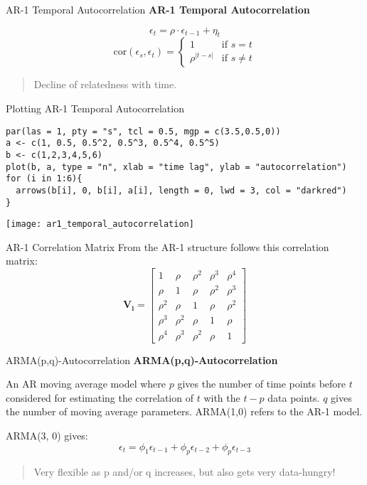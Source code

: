 \documentclass{beamer}
\begin{document}
\begin{frame}{AR-1 Temporal Autocorrelation}
  \textbf{AR-1 Temporal Autocorrelation}
  
  \[
  \epsilon_t = \rho \cdot \epsilon_{t-1} + \eta_t
  \]
  \[
  \text{cor}(\epsilon_s, \epsilon_t) = 
  \begin{cases}
    1 & \text{if } s = t \\
    \rho^{\vert t-s \vert} & \text{if } s \neq t
  \end{cases}
  \]
  \begin{quote}
    Decline of relatedness with time.
  \end{quote}
\end{frame}

\begin{frame}[fragile]{Plotting AR-1 Temporal Autocorrelation}
  \begin{verbatim}
par(las = 1, pty = "s", tcl = 0.5, mgp = c(3.5,0.5,0))
a <- c(1, 0.5, 0.5^2, 0.5^3, 0.5^4, 0.5^5)
b <- c(1,2,3,4,5,6)
plot(b, a, type = "n", xlab = "time lag", ylab = "autocorrelation")
for (i in 1:6){
  arrows(b[i], 0, b[i], a[i], length = 0, lwd = 3, col = "darkred")
}
  \end{verbatim}
  \begin{center}
    \texttt{[image: ar1\_temporal\_autocorrelation]} %
  \end{center}
\end{frame}

\begin{frame}{AR-1 Correlation Matrix}
  From the AR-1 structure follows this correlation matrix:
  \[
  \mathbf{V_i} = 
  \begin{bmatrix}
  1 & \rho & \rho^2 & \rho^3 & \rho^4 \\
  \rho & 1 & \rho & \rho^2 & \rho^3 \\
  \rho^2 & \rho & 1 & \rho & \rho^2 \\
  \rho^3 & \rho^2 & \rho & 1 & \rho \\
  \rho^4 & \rho^3 & \rho^2 & \rho & 1
  \end{bmatrix}
  \]
\end{frame}

\begin{frame}{ARMA(p,q)-Autocorrelation}
  \textbf{ARMA(p,q)-Autocorrelation}
  
  An AR moving average model where $p$ gives the number of time points before $t$ considered for estimating the correlation of $t$ with the $t - p$ data points. $q$ gives the number of moving average parameters. ARMA(1,0) refers to the AR-1 model.
  
  ARMA(3, 0) gives:
  \[
  \epsilon_t = \phi_1\epsilon_{t-1} + \phi_p\epsilon_{t-2} + \phi_p\epsilon_{t-3}
  \]
  \begin{quote}
    Very flexible as p and/or q increases, but also gets very data-hungry!
  \end{quote}
\end{frame}
\end{document}
